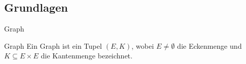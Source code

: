\subsection{Grundlagen}
\begin{frame}{Graph}
\begin{block}{Graph}
Ein Graph ist ein Tupel $(E, K)$, wobei $E \neq \emptyset$ die Eckenmenge und 
$K \subseteq E \times E$ die 
Kantenmenge bezeichnet.
\end{block}
\end{frame}
